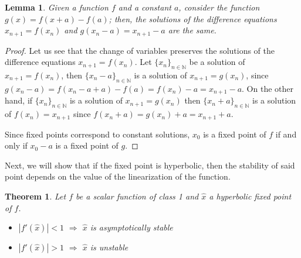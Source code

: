 \documentclass[12pt,a4paper]{report}
\newtheorem{teorema}{Theorem}[section]
\newtheorem{lema}{Lemma}[section]
\theoremstyle{definition}
\begin{document}
\begin{lema}
Given a function $f$ and a constant $a$, consider the function $g(x) = f(x + a) - f(a)$; then, the solutions of the difference equations $x_{n+1} = f(x_n)$ and $g(x_n - a) = x_{n+1} - a$ are the same.
    
\end{lema}

\begin{proof}

Let us see that the change of variables preserves the solutions of the difference equations $x_{n+1} = f(x_n)$. Let $\{x_n\}_{n\in\mathbb{N}}$ be a solution of $x_{n+1} = f(x_n)$, then $\{x_n-a\}_{n \in \mathbb{N}}$ is a solution of $x_{n+1} = g(x_n)$, since $g(x_n - a) = f(x_n - a +a) - f(a) = f(x_n) - a = x_{n+1} - a$.
On the other hand, if $\{x_n\}_{n\in\mathbb{N}}$ is a solution of $x_{n+1} = g(x_n)$ then $\{x_n+a\}_{n \in \mathbb{N}}$ is a solution of $f(x_n) = x_{n+1}$ since $f(x_n + a) = g(x_n) + a = x_{n+1} + a$.

Since fixed points correspond to constant solutions, $x_0$ is a fixed point of $f$ if and only if $x_0 -a$ is a fixed point of $g$.
 
\end{proof}

Next, we will show that if the fixed point is hyperbolic, then the stability of said point depends on the value of the linearization of the function.

\begin{teorema}\label{Teorema1.3.1}
Let $f$ be a scalar function of class 1 and $\hat{x}$ a hyperbolic fixed point of $f$.
\begin{itemize}
    \item $|f'(\hat{x})| <1$ $\Rightarrow$ $\hat{x}$ is asymptotically stable 
    \item $|f'(\hat{x})| > 1 $ $\Rightarrow$  $\hat{x}$ is unstable
\end{itemize}
\end{teorema}
\end{document}
